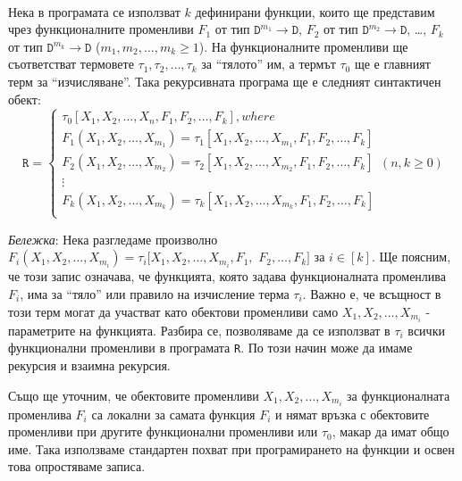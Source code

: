 \documentclass[12pt,twoside,a4paper]{article}
\begin{document}
	\begin{definition}\label{def:R} ~\\
		\indent Нека в програмата се използват $k$ дефинирани функции, които ще представим чрез функционалните променливи $F_1$ от тип $\texttt{D}^{m_1} \to \texttt{D}$, $F_2$ от тип $\texttt{D}^{m_2} \to \texttt{D}$, \dots, $F_k$ от тип $\texttt{D}^{m_k} \to \texttt{D}$ ($m_1, m_2, \dots, m_k \ge 1$). На функционалните променливи ще съответстват термовете $\tau_1, \tau_2, \dots, \tau_k$ за "`тялото"' им, а термът $\tau_0$ ще е главният терм за "`изчисляване"'. Така рекурсивната програма ще е следният синтактичен обект:
		\begin{equation*}
			\texttt{R} =
			\begin{cases}
				\tau_0[X_1, X_2, \dots, X_n, F_1, F_2, \dots, F_k], where\\
				F_1(X_1, X_2, \dots, X_{m_1})=\tau_1[X_1, X_2, \dots, X_{m_1}, F_1, F_2, \dots, F_k]\\
				F_2(X_1, X_2, \dots, X_{m_2})=\tau_2[X_1, X_2, \dots, X_{m_2}, F_1, F_2, \dots, F_k]\\
				\vdots\\
				F_k(X_1, X_2, \dots, X_{m_k})=\tau_k[X_1, X_2, \dots, X_{m_k}, F_1, F_2, \dots, F_k]\\
			\end{cases}
			(n, k \ge 0)
		\end{equation*}
		
		\textit{Бележка}: Нека разгледаме произволно $F_i(X_1, X_2, \dots, X_{m_i}) = \tau_i[X_1, X_2, \dots, X_{m_i},F_1,$ $F_2, \dots, F_k]$ за $i \in [k]$. Ще поясним, че този запис означава, че функцията, която задава функционалната променлива $F_i$, има за "`тяло"' или правило на изчисление терма $\tau_i$. Важно е, че всъщност в този терм могат да участват като обектови променливи само $X_1, X_2, \dots, X_{m_i}$ - параметрите на функцията. Разбира се, позволяваме да се използват в $\tau_i$ всички функционални променливи в програмата \texttt{R}. По този начин може да имаме рекурсия и взаимна рекурсия.
		
		Също ще уточним, че обектовите променливи $X_1, X_2, \dots, X_{m_i}$ за функционалната променлива $F_i$ са локални за самата функция $F_i$ и нямат връзка с обектовите променливи при другите функционални променливи или $\tau_0$, макар да имат общо име. Така използваме стандартен похват при програмирането на функции и освен това опростяваме записа.
	\end{definition}
	
\end{document}
